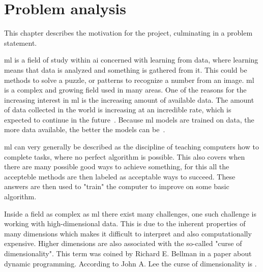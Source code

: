 \chapter{Problem analysis}\label{cha:problem-analysis}
This chapter describes the motivation for the project, culminating in a problem statement.


\gls{ml} is a field of study within \gls{ai} concerned with learning from data, where learning means that data is analyzed and something is gathered from it. This could be methods to solve a puzzle, or patterns to recognize a number from an image. \gls{ml} is a complex and growing field used in many areas. One of the reasons for the increasing interest in \gls{ml} is the increasing amount of available data. The amount of data collected in the world is increasing at an incredible rate, which is expected to continue in the future~\cite{data-never-sleeps}. Because \gls{ml} models are trained on data, the more data available, the better the models can be~\cite{Unreasonable-effectiveness-of-data-Norvig}.

\gls{ml} can very generally be described as the discipline of teaching computers how to complete tasks, where no perfect algorithm is possible. This also covers when there are many possible good ways to achieve something, for this all the accepteble methods are then labeled as acceptable ways to succeed. These answers are then used to "train" the computer to improve on some basic algorithm\cite{alpaydin2020introduction}.

Inside a field as complex as \gls{ml} there exist many challenges, one such challenge is working with high-dimensional data. This is due to the inherent properties of many dimensions which makes it difficult to interpret and also computationally expensive. Higher dimensions are also associated with the so-called "curse of dimensionality". This term was coined by Richard E. Bellman in a paper about dynamic programming\cite{bellmanrand}. According to John A. Lee the curse of dimensionality is .

